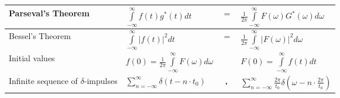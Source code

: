\begin{tabular}{|p{8cm}|l c l|}
 			\hline
        	Parseval's Theorem &
 			$\int\limits_{-\infty}^{\infty}f(t)g^{\ast}(t)dt $ & $=$ & $ \frac{1}{2\pi}
  			\int\limits_{-\infty}^{\infty}F(\omega)G^{\ast}(\omega)d\omega$\\
  			\hline
  			Bessel's Theorem &
  			$\int\limits_{-\infty}^{\infty}|f(t)|^2 dt $ & $=$ & $ \frac{1}{2\pi}
  			\int\limits_{-\infty}^{\infty}|F(\omega)|^2 d\omega$\\
  			\hline
			Initial values &
			$f(0)=\frac{1}{2\pi}\int\limits_{-\infty}^{\infty}F(\omega)d\omega
			$ && $ F(0)=\int\limits_{-\infty}^{\infty}f(t)dt$\\
			\hline
			Infinite sequence of $\delta$-impulses &
			$\sum\limits_{n=-\infty}^{\infty} \delta(t-n\cdot t_0)$ & $\FT$ &
			$\sum\limits_{n=-\infty}^{\infty}
			\frac{2\pi}{t_0}\delta(\omega-n\cdot \frac{2\pi}{t_0})$\\
			\hline
        \end{tabular}
		\renewcommand{\arraystretch}{1}

